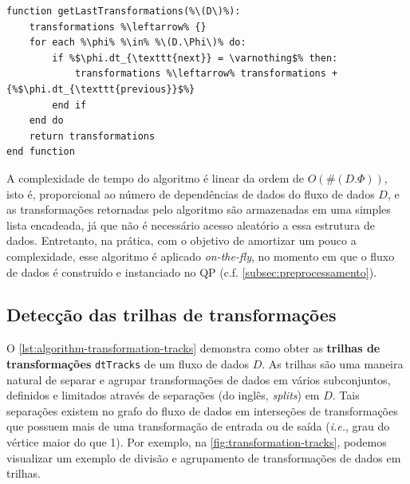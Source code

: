 \begin{minipage}[c]{0.95\textwidth}
\begin{lstlisting}[language=pseudocode,label={lst:algorithm-last-transformations},caption={[Detecção das últimas transformações de dados]Detecção das útimas transformações de dados em uma especificação de fluxo de dados.}]
function getLastTransformations(%\(D\)%):
    transformations %\leftarrow% {}
    for each %\phi% %\in% %\(D.\Phi\)% do:
        if %$\phi.dt_{\texttt{next}} = \varnothing$% then:
            transformations %\leftarrow% transformations + {%$\phi.dt_{\texttt{previous}}$%}
        end if
    end do
    return transformations
end function
\end{lstlisting}
\end{minipage}

A complexidade de tempo do algoritmo é linear da ordem de \( O(\#(D.\Phi)) \), isto é, proporcional ao número de dependências de dados do fluxo de dados \( D \), e as transformações retornadas pelo algoritmo são armazenadas em uma simples lista encadeada, já que não é necessário acesso aleatório a essa estrutura de dados. Entretanto, na prática, com o objetivo de amortizar um pouco a complexidade, esse algoritmo é aplicado \textit{on-the-fly}, no momento em que o fluxo de dados é construído e instanciado no QP (c.f. \autoref{subsec:preprocessamento}).

\subsection{Detecção das trilhas de transformações}%
\label{subsec:deteccao-das-trilhas-de-transformacoes}

O \autoref{lst:algorithm-transformation-tracks} demonstra como obter as \textbf{trilhas de transformações} \texttt{dtTracks} de um fluxo de dados \( D \). As trilhas são uma maneira natural de separar e agrupar transformações de dados em vários subconjuntos, definidos e limitados através de separações (do inglês, \textit{splits}) em \( D \). Tais separações existem no grafo do fluxo de dados em interseções de transformações que possuem mais de uma transformação de entrada ou de saída (\textit{i.e.}, grau do vértice maior do que 1). Por exemplo, na \autoref{fig:transformation-tracks}, podemos visualizar um exemplo de divisão e agrupamento de transformações de dados em trilhas.

